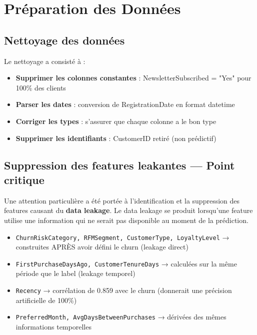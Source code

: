 \documentclass[11pt,a4paper]{article}
\begin{document}
\newpage
\section{Préparation des Données}

\subsection{Nettoyage des données}
Le nettoyage a consisté à :
\begin{itemize}
    \item \textbf{Supprimer les colonnes constantes} : NewsletterSubscribed = "Yes" pour 100\% des clients
    \item \textbf{Parser les dates} : conversion de RegistrationDate en format datetime
    \item \textbf{Corriger les types} : s'assurer que chaque colonne a le bon type
    \item \textbf{Supprimer les identifiants} : CustomerID retiré (non prédictif)
\end{itemize}

\subsection{Suppression des features leakantes — Point critique}
Une attention particulière a été portée à l'identification et la suppression des 
features causant du \textbf{data leakage}. Le data leakage se produit lorsqu'une 
feature utilise une information qui ne serait pas disponible au moment de la prédiction.

\begin{tcolorbox}[title=⚠️ Features leakantes supprimées, colback=warningred!10]
\begin{itemize}
    \item \texttt{ChurnRiskCategory, RFMSegment, CustomerType, LoyaltyLevel} 
    → construites APRÈS avoir défini le churn (leakage direct)
    \item \texttt{FirstPurchaseDaysAgo, CustomerTenureDays} 
    → calculées sur la même période que le label (leakage temporel)
    \item \texttt{Recency} 
    → corrélation de 0.859 avec le churn (donnerait une précision artificielle de 100\%)
    \item \texttt{PreferredMonth, AvgDaysBetweenPurchases}
    → dérivées des mêmes informations temporelles
\end{itemize}
\end{tcolorbox}
\end{document}
